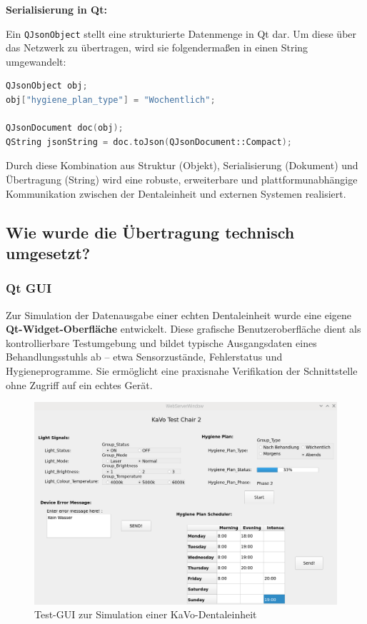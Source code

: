 \textbf{Serialisierung in Qt:}

Ein \texttt{QJsonObject} stellt eine strukturierte Datenmenge in Qt dar. Um diese über das Netzwerk zu übertragen, wird sie folgendermaßen in einen String umgewandelt:

\begin{lstlisting}[language=C++,caption={Serialisierung eines JSON-Objekts in Qt},label={lst:json-qt}]
QJsonObject obj;
obj["hygiene_plan_type"] = "Wochentlich";

QJsonDocument doc(obj);
QString jsonString = doc.toJson(QJsonDocument::Compact);
\end{lstlisting}

Durch diese Kombination aus Struktur (Objekt), Serialisierung (Dokument) und Übertragung (String) wird eine robuste, erweiterbare und plattformunabhängige Kommunikation zwischen der Dentaleinheit und externen Systemen realisiert.


\subsection{Wie wurde die Übertragung technisch umgesetzt?}

\subsubsection{Qt GUI}

Zur Simulation der Datenausgabe einer echten Dentaleinheit wurde eine eigene \textbf{Qt-Widget-Oberfläche} entwickelt. Diese grafische Benutzeroberfläche dient als kontrollierbare Testumgebung und bildet typische Ausgangsdaten eines Behandlungsstuhls ab – etwa Sensorzustände, Fehlerstatus und Hygieneprogramme. Sie ermöglicht eine praxisnahe Verifikation der Schnittstelle ohne Zugriff auf ein echtes Gerät.

\begin{figure}[H]
  \centering
  \includegraphics[width=1\textwidth]{images/guifin1.png}
  \caption{Test-GUI zur Simulation einer KaVo-Dentaleinheit}
  \label{fig:Qt-GUI}
\end{figure}

